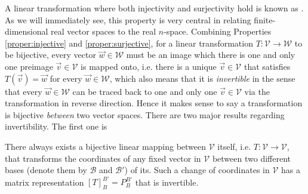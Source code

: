 A linear transformation where both injectivity and surjectivity hold is known as . As we will immediately see, this property is very central in relating finite-dimensional real vector spaces to the real $n$-space. Combining Properties \ref{proper:injective} and \ref{proper:surjective}, for a linear transformation $T: \mathcal{V} \to \mathcal{W}$ to be bijective, every vector $\vec{w} \in \mathcal{W}$ must be an image which there is one and only one preimage $\vec{v} \in \mathcal{V}$ is mapped onto, i.e. there is a unique $\vec{v} \in \mathcal{V}$ that satisfies $T(\vec{v}) = \vec{w}$ for every $\vec{w} \in \mathcal{W}$, which also means that it is \textit{invertible} in the sense that every $\vec{w} \in \mathcal{W}$ can be traced back to one and only one $\vec{v} \in \mathcal{V}$ via the transformation in reverse direction. Hence it makes sense to say a transformation is bijective \textit{between} two vector spaces. There are two major results regarding invertibility. The first one is
\begin{thm}
\label{thm:bijectivechincoord}
There always exists a bijective linear mapping between $\mathcal{V}$ itself, i.e. $T: \mathcal{V} \to \mathcal{V}$, that transforms the coordinates of any fixed vector in $\mathcal{V}$ between two different bases (denote them by $\mathcal{B}$ and $\mathcal{B}'$) of its. Such a change of coordinates in $\mathcal{V}$ has a matrix representation $[T]_B^{B'} = P_B^{B'}$ that is invertible.
\end{thm}
